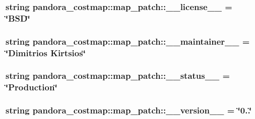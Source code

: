 \hypertarget{namespacepandora__costmap_1_1map__patch_a4bde6233aa6d00ab4838ae076a43885c}{
\subsubsection[{\-\_\-\-\_\-license\-\_\-\-\_\-}]{\setlength{\rightskip}{0pt plus 5cm}string {\bf pandora\-\_\-costmap\-::map\-\_\-patch\-::\-\_\-\-\_\-license\-\_\-\-\_\-} = \char`\"{}\-B\-S\-D\char`\"{}}}\label{namespacepandora__costmap_1_1map__patch_a4bde6233aa6d00ab4838ae076a43885c}
\hypertarget{namespacepandora__costmap_1_1map__patch_abeccfbda61386905af191c66859ea4f9}{
\subsubsection[{\-\_\-\-\_\-maintainer\-\_\-\-\_\-}]{\setlength{\rightskip}{0pt plus 5cm}string {\bf pandora\-\_\-costmap\-::map\-\_\-patch\-::\-\_\-\-\_\-maintainer\-\_\-\-\_\-} = \char`\"{}\-Dimitrios \-Kirtsios\char`\"{}}}\label{namespacepandora__costmap_1_1map__patch_abeccfbda61386905af191c66859ea4f9}
\hypertarget{namespacepandora__costmap_1_1map__patch_a912c00b17181d6deef97037eeae20016}{
\subsubsection[{\-\_\-\-\_\-status\-\_\-\-\_\-}]{\setlength{\rightskip}{0pt plus 5cm}string {\bf pandora\-\_\-costmap\-::map\-\_\-patch\-::\-\_\-\-\_\-status\-\_\-\-\_\-} = \char`\"{}\-Production\char`\"{}}}\label{namespacepandora__costmap_1_1map__patch_a912c00b17181d6deef97037eeae20016}
\hypertarget{namespacepandora__costmap_1_1map__patch_a21d805f93aa4dcebbc1d4647add0db9b}{
\subsubsection[{\-\_\-\-\_\-version\-\_\-\-\_\-}]{\setlength{\rightskip}{0pt plus 5cm}string {\bf pandora\-\_\-costmap\-::map\-\_\-patch\-::\-\_\-\-\_\-version\-\_\-\-\_\-} = \char`\"{}0..\char`\"{}}}\label{namespacepandora__costmap_1_1map__patch_a21d805f93aa4dcebbc1d4647add0db9b}

